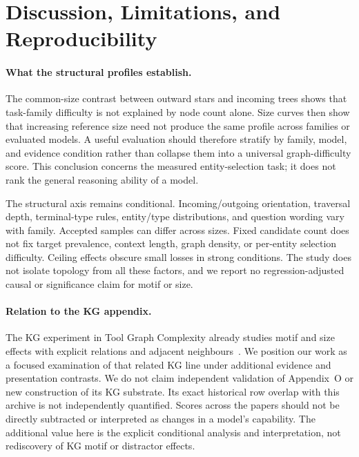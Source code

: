 \section{Discussion, Limitations, and Reproducibility}
\label{sec:discussion}
\paragraph{What the structural profiles establish.}
The common-size contrast between outward stars and incoming trees shows that task-family difficulty is not explained by node count alone. Size curves then show that increasing reference size need not produce the same profile across families or evaluated models. A useful evaluation should therefore stratify by family, model, and evidence condition rather than collapse them into a universal graph-difficulty score. This conclusion concerns the measured entity-selection task; it does not rank the general reasoning ability of a model.

The structural axis remains conditional. Incoming/outgoing orientation, traversal depth, terminal-type rules, entity/type distributions, and question wording vary with family. Accepted samples can differ across sizes. Fixed candidate count does not fix target prevalence, context length, graph density, or per-entity selection difficulty. Ceiling effects obscure small losses in strong conditions. The study does not isolate topology from all these factors, and we report no regression-adjusted causal or significance claim for motif or size.

\paragraph{Relation to the KG appendix.}
The KG experiment in Tool Graph Complexity already studies motif and size effects with explicit relations and adjacent neighbours~\cite{anonymousToolGraph}. We position our work as a focused examination of that related KG line under additional evidence and presentation contrasts. We do not claim independent validation of Appendix~O or new construction of its KG substrate. Its exact historical row overlap with this archive is not independently quantified. Scores across the papers should not be directly subtracted or interpreted as changes in a model's capability. The additional value here is the explicit conditional analysis and interpretation, not rediscovery of KG motif or distractor effects.

